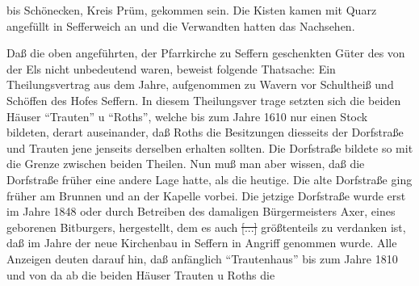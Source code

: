 

bis Schönecken, Kreis Prüm, gekommen sein.\ob
Die Kisten kamen mit Quarz angefüllt in\ob
Sefferweich an und die Verwandten hatten das\ob
Nachsehen.

%
   Daß die oben angeführten, der Pfarrkirche zu Seffern geschenkten\ob
Güter des von der Els nicht unbedeutend waren, beweist\ob
folgende Thatsache: Ein Theilungsvertrag aus dem Jahre, aufgenommen zu Wavern vor Schultheiß und\ob
Schöffen des Hofes Seffern. In diesem Theilungsver\ohb
trage setzten sich die beiden Häuser \enquote{Trauten} u\ob
\enquote{Roths}, welche bis zum Jahre 1610 nur einen Stock\ob
bildeten, derart auseinander, daß Roths die Besitzungen\ob
diesseits der Dorfstraße und Trauten jene jenseits\ob
derselben erhalten sollten. Die Dorfstraße bildete so\ohb
mit die Grenze zwischen beiden Theilen. Nun muß\ob
man aber wissen, daß die Dorfstraße früher eine\ob
andere Lage hatte, als die heutige. Die alte Dorfstraße\ob
ging früher am Brunnen und an der Kapelle vorbei.\ob
Die jetzige Dorfstraße wurde erst im Jahre 1848 oder durch Betreiben des damaligen Bürgermeisters\ob
{}%
Axer\unsicher, eines geborenen Bitburgers, hergestellt, dem\ob
es auch \sout{[...]} größtenteils zu verdanken ist, daß im Jahre der neue Kirchenbau in Seffern in Angriff\ob
genommen wurde. Alle Anzeigen deuten darauf\ob
hin, daß anfänglich \enquote{Trautenhaus} bis zum Jahre 1810\ob
und von da ab die beiden Häuser Trauten u Roths die
\pend
